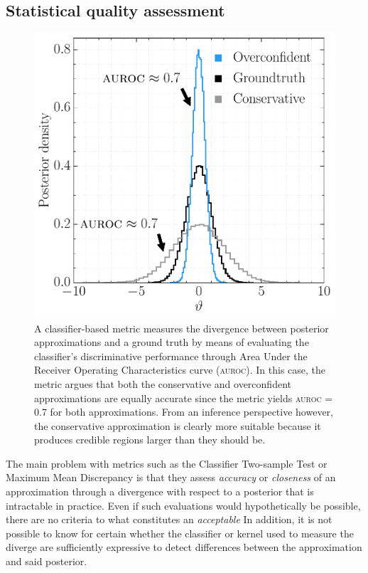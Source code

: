 \documentclass[twoside]{article}
\begin{document}
\subsection{Statistical quality assessment}
\begin{figure}[b!]
    \centering
    \includegraphics[width=\linewidth]{figures/auc-deceitful.pdf}
    \caption{A classifier-based metric measures the divergence between posterior approximations and a ground truth by means of evaluating the classifier's discriminative performance through Area Under the Receiver Operating Characteristics curve (\textsc{auroc}). In this case, the metric argues that both the conservative and overconfident approximations are equally accurate since the metric yields \textsc{auroc} = 0.7 for both approximations. From an inference perspective however, the conservative approximation is clearly more suitable because it produces credible regions larger than they should be.}
    \label{fig:auc_deceitful}
\end{figure}
The main problem with metrics such as the Classifier Two-sample Test \citep{lehmann2006testing,lopez2016revisiting} or Maximum Mean Discrepancy \citep{gretton2012kernel,bengio2013bounding,dziugaite2015training} is that they assess \emph{accuracy} or \emph{closeness} of an approximation through a divergence with respect to a posterior that is intractable in practice.
Even if such evaluations would hypothetically be possible,
there are no criteria to what constitutes an \emph{acceptable}
In addition, it is not possible to know for certain whether the classifier or kernel used to measure the diverge are sufficiently expressive to detect differences between the approximation and said posterior.
\end{document}
